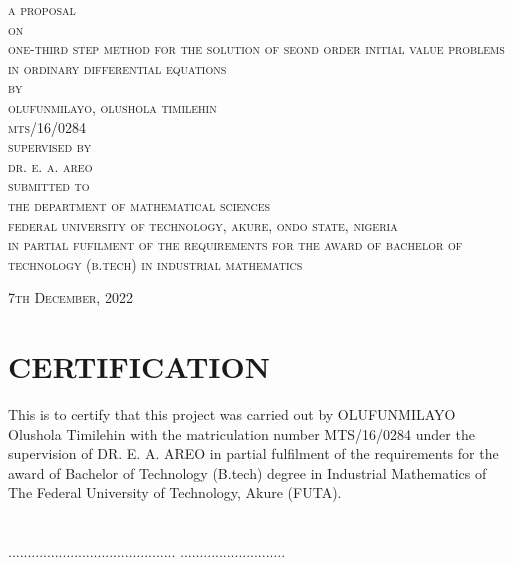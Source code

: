 \documentclass[12pt]{report}
\begin{document}
\begin{titlepage}
	\begin{center}
		\Large \textsc{a proposal}\\
		[5mm]
		\Large \textsc{on}\\
		[5mm]
		\Large \textsc{one-third step method for the solution of seond order initial value problems in ordinary differential equations}\\
		[5mm]
		\Large \textsc{by}\\
		[5mm]
		\Large \textsc{olufunmilayo, olushola timilehin \\ mts/16/0284}\\
		[5mm]
		\Large \textsc{supervised by}\\
		\Large \textsc{dr. e. a. areo}\\
		[5mm]
		\Large \textsc{submitted to}\\
		\Large \textsc{the department of mathematical sciences} \\ 
		\Large \textsc{federal university of technology, akure, ondo state, nigeria}\\
		[5mm]
		\Large \textsc{in partial fufilment of the requirements for the award of bachelor of technology (b.tech) in industrial mathematics}\\
		[12mm]
	\end{center}
	
	\begin{flushright}
		\large \textsc{7th December, 2022}
	\end{flushright}

\end{titlepage}

\newpage
{}


    \chapter*{CERTIFICATION}
%
\noindent This is to certify that this project was carried out by OLUFUNMILAYO Olushola Timilehin with the matriculation number MTS/16/0284 under the supervision of DR. E. A. AREO in partial fulfilment of the requirements for the award of Bachelor of Technology (B.tech) degree in Industrial Mathematics of The Federal University of Technology, Akure (FUTA). \\
\\ \\

\noindent........................................... \hspace{10.7cm}
...........................
\end{document}
